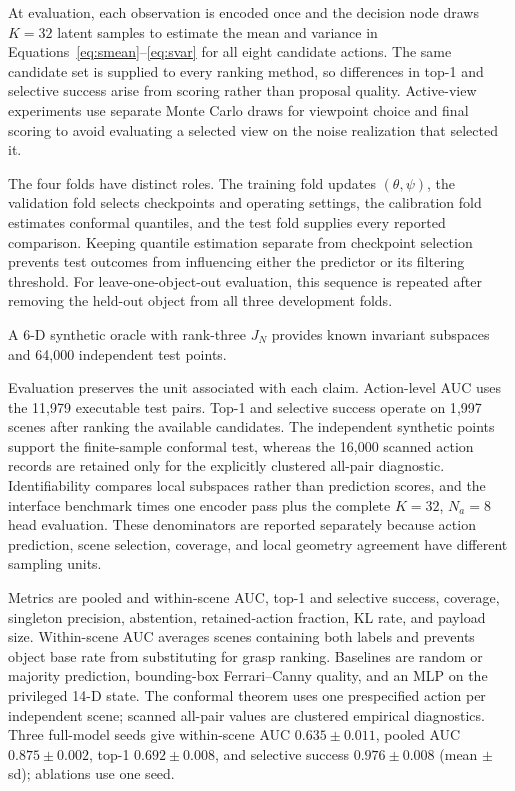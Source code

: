 \documentclass[letterpaper, 10pt, conference]{ieeeconf}
\begin{document}
At evaluation, each observation is encoded once and the decision node draws
$K=32$ latent samples to estimate the mean and variance in
Equations~\eqref{eq:smean}--\eqref{eq:svar} for all eight candidate actions.
The same candidate set is supplied to every ranking method, so differences in
top-1 and selective success arise from scoring rather than proposal quality.
Active-view experiments use separate Monte Carlo draws for viewpoint choice
and final scoring to avoid evaluating a selected view on the noise realization
that selected it.

The four folds have distinct roles. The training fold updates
$(\theta,\psi)$, the validation fold selects checkpoints and operating
settings, the calibration fold estimates conformal quantiles, and the test
fold supplies every reported comparison. Keeping quantile estimation separate
from checkpoint selection prevents test outcomes from influencing either the
predictor or its filtering threshold. For leave-one-object-out evaluation,
this sequence is repeated after removing the held-out object from all three
development folds.

A 6-D synthetic oracle with rank-three $J_N$ provides known invariant
subspaces and 64{,}000 independent test points.

Evaluation preserves the unit associated with each claim. Action-level AUC
uses the 11{,}979 executable test pairs. Top-1 and selective success operate
on 1{,}997 scenes after ranking the available candidates. The independent
synthetic points support the finite-sample conformal test, whereas the
16{,}000 scanned action records are retained only for the explicitly
clustered all-pair diagnostic. Identifiability compares local subspaces rather
than prediction scores, and the interface benchmark times one encoder pass
plus the complete $K{=}32$, $N_a{=}8$ head evaluation. These denominators are
reported separately because action prediction, scene selection, coverage,
and local geometry agreement have different sampling units.

Metrics are pooled and within-scene AUC, top-1 and selective success,
coverage, singleton precision, abstention, retained-action fraction, KL rate,
and payload size. Within-scene AUC averages scenes containing both labels and
prevents object base rate from substituting for grasp ranking. Baselines are
random or majority prediction, bounding-box Ferrari--Canny quality, and an
MLP on the privileged 14-D state. The conformal theorem uses one prespecified
action per independent scene; scanned all-pair values are clustered empirical
diagnostics. Three full-model seeds give within-scene AUC
$0.635\pm0.011$, pooled AUC $0.875\pm0.002$, top-1 $0.692\pm0.008$, and
selective success $0.976\pm0.008$ (mean $\pm$ sd); ablations use one seed.
\end{document}
